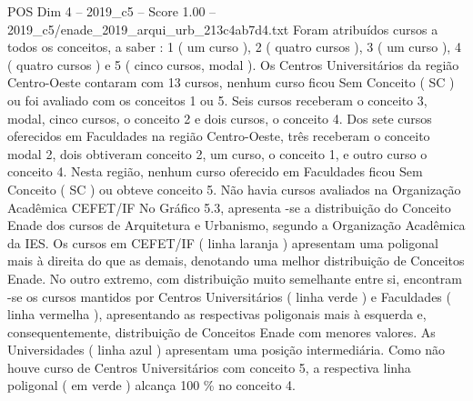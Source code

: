 \begin{textsample}{POS Dim 4 – 2019\_c5 – Score 1.00 – 2019\_c5/enade\_2019\_arqui\_urb\_213c4ab7d4.txt}
Foram atribuídos cursos a todos os conceitos, a saber : 1 ( um curso ), 2 ( quatro cursos ), 3 ( um curso ), 4 ( quatro cursos ) e 5 ( cinco cursos, modal ).
Os Centros Universitários da região Centro-Oeste contaram com 13 cursos, nenhum curso ficou Sem Conceito ( SC ) ou foi avaliado com os conceitos 1 ou 5.
Seis cursos receberam o conceito 3, modal, cinco cursos, o conceito 2 e dois cursos, o conceito 4.
Dos sete cursos oferecidos em Faculdades na região Centro-Oeste, três receberam o conceito modal 2, dois obtiveram conceito 2, um curso, o conceito 1, e outro curso o conceito 4.
Nesta região, nenhum curso oferecido em Faculdades ficou Sem Conceito ( SC ) ou obteve conceito 5.
Não havia cursos avaliados na Organização Acadêmica CEFET/IF No Gráfico 5.3, apresenta -se a distribuição do Conceito Enade dos cursos de Arquitetura e Urbanismo, segundo a Organização Acadêmica da IES.
Os cursos em CEFET/IF ( linha laranja ) apresentam uma poligonal mais à direita do que as demais, denotando uma melhor distribuição de Conceitos Enade.
No outro extremo, com distribuição muito semelhante entre si, encontram -se os cursos mantidos por Centros Universitários ( linha verde ) e Faculdades ( linha vermelha ), apresentando as respectivas poligonais mais à esquerda e, consequentemente, distribuição de Conceitos Enade com menores valores.
As Universidades ( linha azul ) apresentam uma posição intermediária.
Como não houve curso de Centros Universitários com conceito 5, a respectiva linha poligonal ( em verde ) alcança 100 \% no conceito 4.

\end{textsample}

